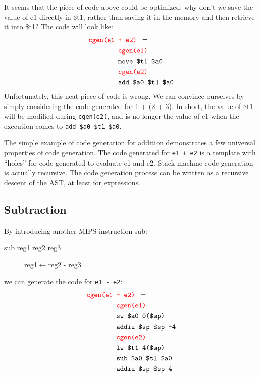 It seems that the piece of code above could be optimized: why don't we save the value of e1 directly in \$t1, rather than saving it in the memory and then retrieve it into \$t1? The code will look like:
\begin{align*}
\texttt{\color{red}cgen(e1 }&\texttt{\color{red}+ e2) }=\\
&\texttt{\color{red}cgen(e1)}\\
&\texttt{move \$t1 \$a0}\\
&\texttt{\color{red} cgen(e2)}\\
&\texttt{add \$a0 \$t1 \$a0}
\end{align*}
Unfortunately, this neat piece of code is wrong. We can convince ourselves by simply considering the code generated for 1 + (2 + 3). In short, the value of \$t1 will be modified during \texttt{cgen(e2)}, and is no longer the value of e1 when the execution comes to \texttt{add \$a0 \$t1 \$a0}.

The simple example of code generation for addition demonstrates a few universal properties of code generation. The code generated for \texttt{e1 + e2} is a template with ``holes'' for code generated to evaluate e1 and e2. Stack machine code generation is actually recursive. The code generation process can be written as a recursive descent of the AST, at least for expressions.

\subsection{Subtraction}
By introducing another MIPS instruction sub:
\begin{description}
\item[sub reg1 reg2 reg3] reg1$\leftarrow$reg2 - reg3
\end{description}
we can generate the code for \texttt{e1 - e2}:
\begin{align*}
\texttt{\color{red}cgen(e1 }&\texttt{\color{red}- e2) }=\\
&\texttt{\color{red}cgen(e1)}\\
&\texttt{sw \$a0 0(\$sp)}\\
&\texttt{addiu \$sp \$sp -4}\\
&\texttt{\color{red}cgen(e2)}\\
&\texttt{lw \$t1 4(\$sp)}\\
&\texttt{sub \$a0 \$t1 \$a0}\\
&\texttt{addiu \$sp \$sp 4}
\end{align*}

